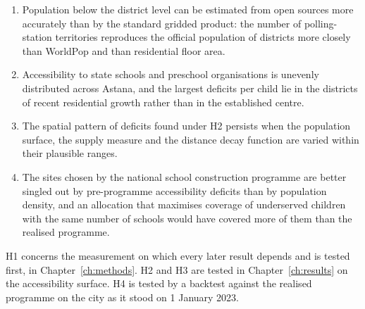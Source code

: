 \begin{enumerate}[label=H\arabic*.,nosep,leftmargin=*]
  \item Population below the district level can be estimated from open sources more accurately than by the standard gridded product: the number of polling-station territories reproduces the official population of districts more closely than WorldPop and than residential floor area.
  \item Accessibility to state schools and preschool organisations is unevenly distributed across Astana, and the largest deficits per child lie in the districts of recent residential growth rather than in the established centre.
  \item The spatial pattern of deficits found under H2 persists when the population surface, the supply measure and the distance decay function are varied within their plausible ranges.
  \item The sites chosen by the national school construction programme are better singled out by pre-programme accessibility deficits than by population density, and an allocation that maximises coverage of underserved children with the same number of schools would have covered more of them than the realised programme.
\end{enumerate}

H1 concerns the measurement on which every later result depends and is tested first, in Chapter~\ref{ch:methods}. H2 and H3 are tested in Chapter~\ref{ch:results} on the accessibility surface. H4 is tested by a backtest against the realised programme on the city as it stood on 1 January 2023.
